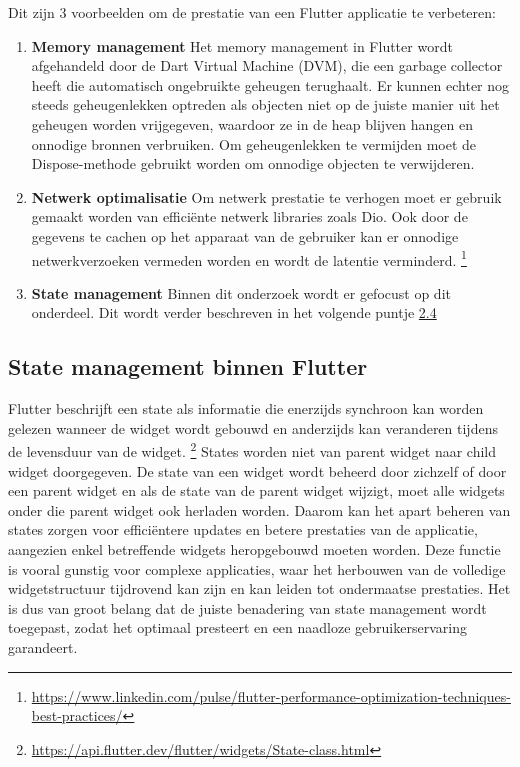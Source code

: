Dit zijn 3 voorbeelden om de prestatie van een Flutter applicatie te verbeteren:
\begin{enumerate}
    \item \textbf{Memory management}
    \newline 
    Het memory management in Flutter wordt afgehandeld door de Dart Virtual Machine (DVM), die een garbage collector heeft die automatisch ongebruikte geheugen terughaalt. Er kunnen echter nog steeds geheugenlekken optreden als objecten niet op de juiste manier uit het geheugen worden vrijgegeven, waardoor ze in de heap blijven hangen en onnodige bronnen verbruiken. Om geheugenlekken te vermijden moet de Dispose-methode gebruikt worden om onnodige objecten te verwijderen. \autocite{sabbagh2023}
    \item \textbf{Netwerk optimalisatie}
    \newline 
    Om netwerk prestatie te verhogen moet er gebruik gemaakt worden van efficiënte netwerk libraries zoals Dio. Ook door de gegevens te cachen op het apparaat van de gebruiker kan er onnodige netwerkverzoeken vermeden worden en wordt de latentie verminderd. \footnote{\url{https://www.linkedin.com/pulse/flutter-performance-optimization-techniques-best-practices/}}
    \item \textbf{State management}
    \newline Binnen dit onderzoek wordt er gefocust op dit onderdeel. Dit wordt verder beschreven in het volgende puntje \hyperref[sec:states]{2.4}
\end{enumerate}

\subsection{State management binnen Flutter}
\label{sec:states}
Flutter beschrijft een state als informatie die enerzijds synchroon kan worden gelezen wanneer de widget wordt gebouwd en anderzijds kan veranderen tijdens de levensduur van de widget. \footnote{\url{https://api.flutter.dev/flutter/widgets/State-class.html}}
\newline
States worden niet van parent widget naar child widget doorgegeven. De state van een widget wordt beheerd door zichzelf of door een parent widget en als de state van de parent widget wijzigt, moet alle widgets onder die parent widget ook herladen worden. Daarom kan het apart beheren van states zorgen voor efficiëntere updates en betere prestaties van de applicatie, aangezien enkel betreffende widgets heropgebouwd moeten worden. Deze functie is vooral gunstig voor complexe applicaties, waar het herbouwen van de volledige widgetstructuur tijdrovend kan zijn en kan leiden tot ondermaatse prestaties. Het is dus van groot belang dat de juiste benadering van state management wordt toegepast, zodat het optimaal presteert en een naadloze gebruikerservaring garandeert. \autocite{sid2023}

